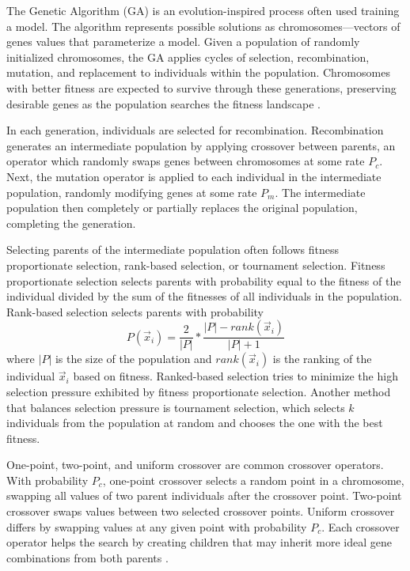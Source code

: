 \documentclass[twoside,11pt]{article}
\begin{document}
	The Genetic Algorithm (GA) is an evolution-inspired process often used training a model. 
	The algorithm represents possible solutions as chromosomes---vectors of genes values that parameterize a model. 
	Given a population of randomly initialized chromosomes, the GA applies cycles of selection, recombination, mutation, and replacement to individuals within the population. 
	Chromosomes with better fitness are expected to survive through these generations, preserving desirable genes as the population searches the fitness landscape \citep{ga_tutorial}.

	In each generation, individuals are selected for recombination. 
	Recombination generates an intermediate population by applying crossover between parents, an operator which randomly swaps genes between chromosomes at some rate $P_c$. 
	Next, the mutation operator is applied to each individual in the intermediate population, randomly modifying genes at some rate $P_m$. 
	The intermediate population then completely or partially replaces the original population, completing the generation.

	Selecting parents of the intermediate population often follows fitness proportionate selection, rank-based selection, or tournament selection. 
	Fitness proportionate selection selects parents with probability equal to the fitness of the individual divided by the sum of the fitnesses of all individuals in the population. 
	Rank-based selection selects parents with probability
	$$P(\vec{x}_i) = \frac{2}{|P|} * \frac{|P| - rank(\vec{x}_i)}{|P|+1}$$
	where $|P|$ is the size of the population and $rank(\vec{x}_i)$ is the ranking of the individual $\vec{x}_i$ based on fitness. 
	Ranked-based selection tries to minimize the high selection pressure exhibited by fitness proportionate selection. 
	Another method that balances selection pressure is tournament selection, which selects $k$ individuals from the population at random and chooses the one with the best fitness.

	One-point, two-point, and uniform crossover are common crossover operators. 
	With probability $P_c$, one-point crossover selects a random point in a chromosome, swapping all values of two parent individuals after the crossover point. 
	Two-point crossover swaps values between two selected crossover points. 
	Uniform crossover differs by swapping values at any given point with probability $P_c$. 
	Each crossover operator helps the search by creating children that may inherit more ideal gene combinations from both parents \citep{ga_tutorial}.
\end{document}
